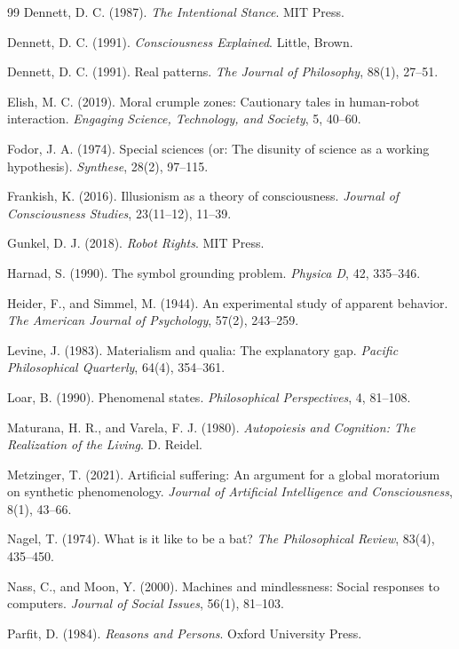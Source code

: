 \documentclass[12pt]{article}
\theoremstyle{definition}
\begin{document}
\begin{thebibliography}{99}
 Dennett, D. C. (1987). \emph{The Intentional Stance}. MIT Press.

 Dennett, D. C. (1991). \emph{Consciousness Explained}. Little, Brown.

 Dennett, D. C. (1991). Real patterns. \emph{The Journal of Philosophy}, 88(1), 27--51.

 Elish, M. C. (2019). Moral crumple zones: Cautionary tales in human-robot interaction. \emph{Engaging Science, Technology, and Society}, 5, 40--60.

 Fodor, J. A. (1974). Special sciences (or: The disunity of science as a working hypothesis). \emph{Synthese}, 28(2), 97--115.

 Frankish, K. (2016). Illusionism as a theory of consciousness. \emph{Journal of Consciousness Studies}, 23(11--12), 11--39.

 Gunkel, D. J. (2018). \emph{Robot Rights}. MIT Press.

 Harnad, S. (1990). The symbol grounding problem. \emph{Physica D}, 42, 335--346.

 Heider, F., and Simmel, M. (1944). An experimental study of apparent behavior. \emph{The American Journal of Psychology}, 57(2), 243--259.

 Levine, J. (1983). Materialism and qualia: The explanatory gap. \emph{Pacific Philosophical Quarterly}, 64(4), 354--361.

 Loar, B. (1990). Phenomenal states. \emph{Philosophical Perspectives}, 4, 81--108.

 Maturana, H. R., and Varela, F. J. (1980). \emph{Autopoiesis and Cognition: The Realization of the Living}. D. Reidel.

 Metzinger, T. (2021). Artificial suffering: An argument for a global moratorium on synthetic phenomenology. \emph{Journal of Artificial Intelligence and Consciousness}, 8(1), 43--66.

 Nagel, T. (1974). What is it like to be a bat? \emph{The Philosophical Review}, 83(4), 435--450.

 Nass, C., and Moon, Y. (2000). Machines and mindlessness: Social responses to computers. \emph{Journal of Social Issues}, 56(1), 81--103.

 Parfit, D. (1984). \emph{Reasons and Persons}. Oxford University Press.


\end{thebibliography}
\end{document}
